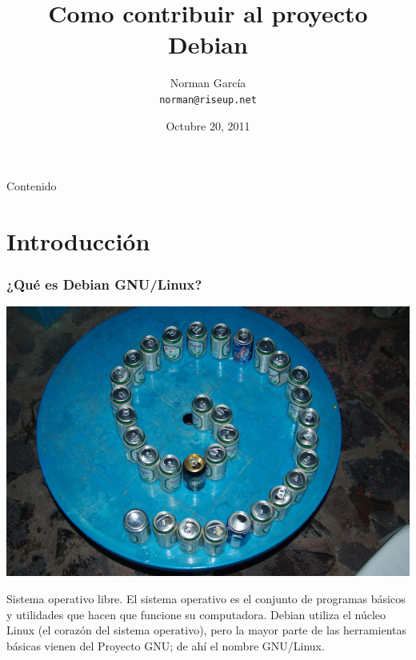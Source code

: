 \documentclass{beamer}
\title{Como contribuir al proyecto Debian}
\author[n0rman]{Norman Garc\'ia \\ \texttt{norman@riseup.net}}
\institute{Debian Nicaragua}
\date{Octubre 20, 2011}
\begin{document}
\begin{frame}
	\titlepage
\end{frame}

\begin{frame}{Contenido}
	\tableofcontents
\end{frame}


\section{Introducci\'on}

\begin{frame}
\frametitle{¿Qu\'e es Debian GNU/Linux?}
        \begin{center}
                 \includegraphics[scale=0.20]{../img/foto2950.jpg}
        \end{center}

        \pause

	Sistema operativo libre. El sistema operativo es el conjunto de programas b\'asicos y utilidades que 
        hacen que funcione su computadora. Debian utiliza el n\'ucleo Linux (el coraz\'on del sistema operativo), pero la mayor parte de las herramientas
        b\'asicas vienen del Proyecto GNU; de ah\'i el nombre GNU/Linux.
\end{frame}
\end{document}
